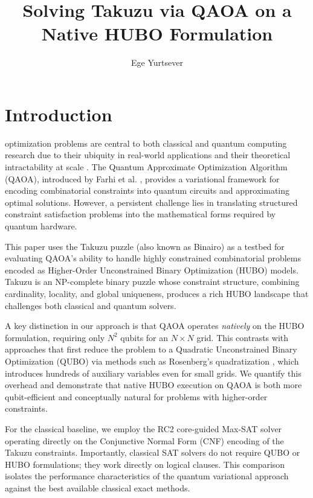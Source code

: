 \documentclass[eng]{ajceam-class}
\title{Solving Takuzu via QAOA on a Native HUBO Formulation}
\author[1]{Ege Yurtsever}
\affil[1]{Faculty of Engineering and Natural Sciences, Sabancı University, Turkey}
\begin{document}
\maketitle
\thispagestyle{fancy}
\printcontactdata

\section{Introduction}
 optimization problems are central to both classical and quantum computing research due to their ubiquity in real-world applications and their theoretical intractability at scale \cite{lucas2014ising}. The Quantum Approximate Optimization Algorithm (QAOA), introduced by Farhi et al. \cite{farhi2014qaoa}, provides a variational framework for encoding combinatorial constraints into quantum circuits and approximating optimal solutions. However, a persistent challenge lies in translating structured constraint satisfaction problems into the mathematical forms required by quantum hardware.

This paper uses the Takuzu puzzle (also known as Binairo) as a testbed for evaluating QAOA's ability to handle highly constrained combinatorial problems encoded as Higher-Order Unconstrained Binary Optimization (HUBO) models. Takuzu is an NP-complete binary puzzle \cite{takuzunp2016} whose constraint structure, combining cardinality, locality, and global uniqueness, produces a rich HUBO landscape that challenges both classical and quantum solvers.

A key distinction in our approach is that QAOA operates \emph{natively} on the HUBO formulation, requiring only $N^2$ qubits for an $N \times N$ grid. This contrasts with approaches that first reduce the problem to a Quadratic Unconstrained Binary Optimization (QUBO) via methods such as Rosenberg's quadratization \cite{rosenberg1975reduction}, which introduces hundreds of auxiliary variables even for small grids. We quantify this overhead and demonstrate that native HUBO execution on QAOA is both more qubit-efficient and conceptually natural for problems with higher-order constraints.

For the classical baseline, we employ the RC2 core-guided Max-SAT solver \cite{ignatiev2019rc2} operating directly on the Conjunctive Normal Form (CNF) encoding of the Takuzu constraints. Importantly, classical SAT solvers do not require QUBO or HUBO formulations; they work directly on logical clauses. This comparison isolates the performance characteristics of the quantum variational approach against the best available classical exact methods.
\end{document}

